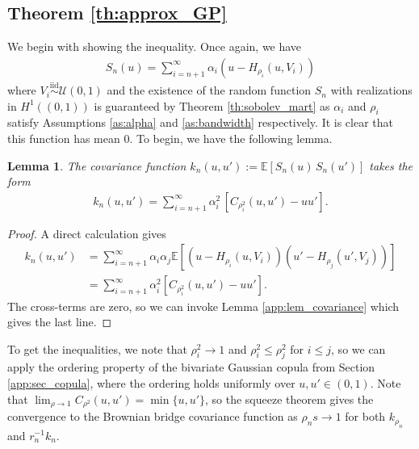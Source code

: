 \documentclass[11pt,a4paper]{article}
\newtheorem{lem}{Lemma}
\newcommand{\iid}{\overset{\mathrm{iid}}{\sim}}
\newcommand{\E}{\mathbb{E}}
\begin{document}
\begin{appendices}
 
\subsection{Theorem \ref{th:approx_GP}}
We begin with showing the inequality. Once again, we have
\begin{align*}
    S_n(u) = \sum_{i = n+1}^\infty \alpha_i(u - H_{\rho_i}(u,V_i))
\end{align*}
where $V_i \iid \mathcal{U}(0,1)$ and the existence of the random function $S_n$ with realizations in $H^1((0,1))$ is guaranteed by {Theorem \ref{th:sobolev_mart}} as $\alpha_i$ and $\rho_i$ satisfy {Assumptions \ref{as:alpha}}  and {\ref{as:bandwidth}} respectively. It is clear that this function has mean 0. To begin, we have the following lemma.
\begin{lem}
    The covariance function $k_n(u,u') := \E[S_n(u)\, S_n(u')]$ takes the form
    \begin{align*}
        k_n(u,u') = \sum_{i = n+1}^\infty \alpha_i^2 \,[C_{\rho_i^2}(u,u') - uu'].
    \end{align*}
\end{lem}
\begin{proof}
A direct calculation gives
    \begin{align*}
        k_n(u,u') &= \sum_{i = n+1}^\infty \alpha_i \alpha_j \E\left[\left(u - H_{\rho_i}(u,V_i)\right)\left(u' - H_{\rho_j}(u',V_j)\right)\right]\\
        &=  \sum_{i = n+1}^\infty \alpha_i^2 \left[C_{\rho_i^2}(u,u')- u u'\right].
    \end{align*}
    The cross-terms are zero, so we can invoke {Lemma \ref{app:lem_covariance}} which gives the last line. 
\end{proof}
To get the inequalities, we note that $\rho_i^2 \to 1$ and $\rho_i^2 \leq \rho_j^2$ for $i \leq j$, so we can 
 apply the ordering property of the bivariate Gaussian copula from Section \ref{app:sec_copula}, where the ordering holds uniformly over $u,u'\in(0,1)$. Note that  $\lim_{\rho \to 1} C_{\rho^2}(u,u') = \min\{u,u'\}$, so the squeeze theorem gives the convergence to the Brownian bridge covariance function as $\rho_ns \to 1$ for both $k_{\rho_n}$ and $r_n^{-1} k_n$.


\end{appendices}
\end{document}
